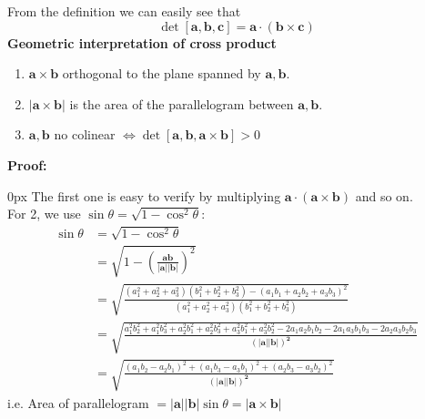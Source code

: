 \documentclass{article}
\begin{document}
From the definition we can easily see that
\begin{equation*}
    \det [\mathbf{a, b, c}] = \mathbf{a} \cdot (\mathbf{b\times c})
\end{equation*}
\textbf{Geometric interpretation of cross product}
\begin{enumerate}
    \item $\mathbf{a \times b}$ orthogonal to the plane spanned by $\mathbf{a, b}$.
    \item $|\mathbf{a\times b}|$ is the area of the parallelogram between $\mathbf{a, b}$.
    \item $\mathbf{a, b}$ no colinear $\iff \det[\mathbf{a, b, a\times b}] > 0$
\end{enumerate}
\textbf{Proof:}
\begin{addmargin}[10px]{0px}
    The first one is easy to verify by multiplying $\mathbf{a\cdot (a\times b)}$ and so on.\\
    For 2, we use $\sin \theta = \sqrt{1 - \cos^2 \theta}$:
    \begin{equation*}
        \begin{split}
            \sin \theta &= \sqrt{1 - \cos^2 \theta}\\
            &= \sqrt{1 - \left(\mathbf{\frac{ab}{|a||b|}}\right)^2}\\
            &= \sqrt{\frac{(a_1^2 + a_2^2 + a_3^2)(b_1^2 + b_2^2 + b_3^2) - (a_1b_1 + a_2b_2 + a_3b_3)^2}
            {(a_1^2 + a_2^2 + a_3^2)(b_1^2 + b_2^2 + b_3^2)}}\\
            &= \sqrt{\frac{a_1^2b_2^2 +a_1^2b_3^2 + a_2^2b_1^2 + a_2^2b_3^2 + a_3^2b_1^2 + a_3^2b_2^2 - 2a_1a_2b_1b_2 - 2a_1a_3b_1b_3 - 2a_2a_3b_2b_3}
            {\mathbf{(|a||b|)^2}}}\\
            &= \sqrt{\frac{(a_1b_2-a_2b_1)^2 + (a_1b_3-a_3b_1)^2 + (a_2b_3-a_3b_2)^2}
            {\mathbf{(|a||b|)^2}}}
        \end{split}
    \end{equation*}
    i.e. Area of parallelogram $= \mathbf{|a||b|}\sin \theta = |\mathbf{a\times b}|$
\end{addmargin}
\end{document}
